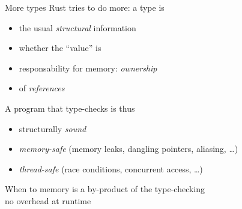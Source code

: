 \documentclass[10pt]{beamer}
\begin{document}
\begin{frame}{More types}
  Rust tries to do more: a type is
  \begin{itemize}
    \item the usual \emph{structural} information
    \item whether the ``value'' is 
    \item responsability for  memory: \emph{ownership}
    \item {} of \emph{references}
  \end{itemize}
  \bigskip
  \pause
  A program that type-checks is thus 
  \begin{itemize}
    \item structurally \emph{sound}
    \item \emph{memory-safe}
      (memory leaks, dangling pointers, aliasing, \ldots)
    \item \emph{thread-safe}
      (race conditions, concurrent access, \ldots)
  \end{itemize}
  \medskip
  \pause
  When to  memory is a by-product of the type-checking\\
  \daimpl no overhead at runtime
\end{frame}























\end{document}
